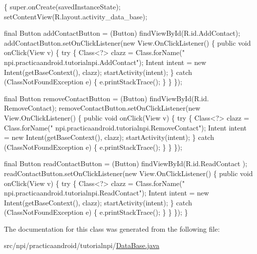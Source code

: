 \begin{DoxyCode}
                                                       \{
        super.onCreate(savedInstanceState);
        setContentView(R.layout.activity\_data\_base);
        
        \textcolor{keyword}{final} Button addContactButton = (Button) findViewById(R.id.AddContact);
        addContactButton.setOnClickListener(\textcolor{keyword}{new} View.OnClickListener() \{
            \textcolor{keyword}{public} \textcolor{keywordtype}{void} onClick(View v) \{
                \textcolor{keywordflow}{try} \{
                    Class<?> clazz = Class.forName(\textcolor{stringliteral}{"
      npi.practicaandroid.tutorialnpi.AddContact"});
                    Intent intent = \textcolor{keyword}{new} Intent(getBaseContext(), clazz);
                    startActivity(intent);
                \}
                \textcolor{keywordflow}{catch} (ClassNotFoundException e) \{
                    e.printStackTrace();
                \}
            \}
        \});
        
        \textcolor{keyword}{final} Button removeContactButton = (Button) findViewById(R.id.
      RemoveContact);
        removeContactButton.setOnClickListener(\textcolor{keyword}{new} View.OnClickListener() \{
            \textcolor{keyword}{public} \textcolor{keywordtype}{void} onClick(View v) \{
                \textcolor{keywordflow}{try} \{
                    Class<?> clazz = Class.forName(\textcolor{stringliteral}{"
      npi.practicaandroid.tutorialnpi.RemoveContact"});
                    Intent intent = \textcolor{keyword}{new} Intent(getBaseContext(), clazz);
                    startActivity(intent);
                \}
                \textcolor{keywordflow}{catch} (ClassNotFoundException e) \{
                    e.printStackTrace();
                \}
            \}
        \});
        
        \textcolor{keyword}{final} Button readContactButton = (Button) findViewById(R.id.ReadContact
      );
        readContactButton.setOnClickListener(\textcolor{keyword}{new} View.OnClickListener() \{
            \textcolor{keyword}{public} \textcolor{keywordtype}{void} onClick(View v) \{
                \textcolor{keywordflow}{try} \{
                    Class<?> clazz = Class.forName(\textcolor{stringliteral}{"
      npi.practicaandroid.tutorialnpi.ReadContact"});
                    Intent intent = \textcolor{keyword}{new} Intent(getBaseContext(), clazz);
                    startActivity(intent);
                \}
                \textcolor{keywordflow}{catch} (ClassNotFoundException e) \{
                    e.printStackTrace();
                \}
            \}
        \});
    \}
\end{DoxyCode}


The documentation for this class was generated from the following file\-:\begin{DoxyCompactItemize}
\item 
src/npi/practicaandroid/tutorialnpi/\hyperlink{_data_base_8java}{Data\-Base.\-java}\end{DoxyCompactItemize}
